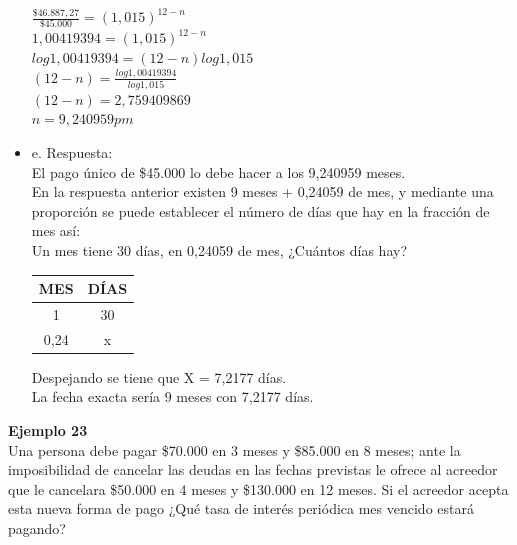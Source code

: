 \begin{itemize}
	$\frac{\$46.887,27}{\$45.000} = (1,015)^{12-n}$\\
	
	$1,00419394 = (1,015)^{12-n}$\\
	
	$log1,00419394= (12-n)log1,015$\\
	
	$(12 - n) = \frac{log1,00419394}{log1,015}$\\
	
	$(12 - n) = 2,759409869$\\
	
	$n = 9,240959 pm$\\
	
	\item e. Respuesta:\\
	
	El pago único de \$45.000 lo debe hacer a los 9,240959 meses.\\
	
	En la respuesta anterior existen 9 meses + 0,24059 de mes, y mediante una proporción se puede establecer el número de días que hay en la fracción de mes así:\\
	Un mes tiene 30 días, en 0,24059 de mes, ¿Cuántos días hay?\\
	
\begin{table}[]
\centering
\label{my-label}
\begin{tabular}{|c|c|}
\hline
\textbf{MES} & \textbf{DÍAS} \\ \hline
1            & 30            \\ \hline
0,24         & x             \\ \hline
\end{tabular}
\end{table}

	Despejando se tiene que X = 7,2177 días.\\
	
	La fecha exacta sería 9 meses con 7,2177 días.\\
	
\end{itemize}

\textbf{Ejemplo 23}\\

Una persona debe pagar \$70.000 en 3 meses y \$85.000 en 8 meses; ante la imposibilidad de cancelar las deudas en las fechas previstas le ofrece al acreedor que le cancelara \$50.000 en 4 meses y \$130.000 en 12 meses. Si el acreedor acepta esta nueva forma de pago ¿Qué tasa de interés periódica mes vencido estará pagando?\\

